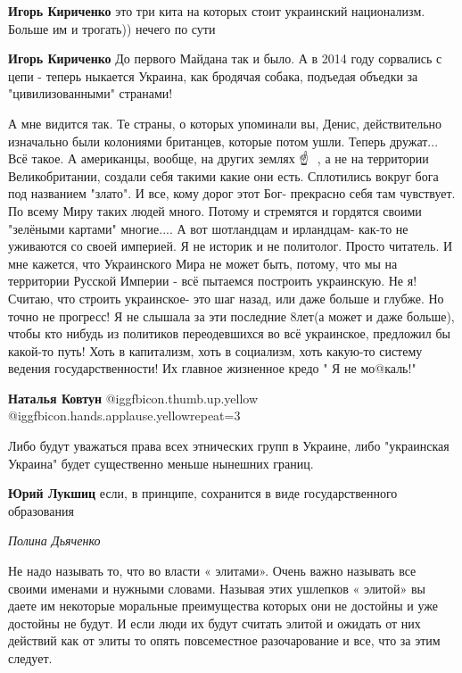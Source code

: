 \begin{itemize}
\begin{itemize}
\textbf{Игорь Кириченко} это три кита на которых стоит украинский национализм. Больше им и трогать)) нечего по сути

\textbf{Игорь Кириченко} До первого Майдана так и было. А в 2014 году сорвались с цепи - теперь ныкается Украина, как бродячая собака, подъедая объедки за "цивилизованными" странами!
\end{itemize} %


А мне видится так. Те страны, о которых упоминали вы, Денис, действительно
изначально были колониями британцев, которые потом ушли. Теперь дружат... Всё
такое. А американцы, вообще, на других землях ☝ ️ , а не на территории
Великобритании, создали себя такими какие они есть. Сплотились вокруг бога под
названием "злато". И все, кому дорог этот Бог- прекрасно себя там чувствует. По
всему Миру таких людей много. Потому и стремятся и гордятся своими "зелёными
картами" многие.... А вот шотландцам и ирландцам- как-то не уживаются со своей
империей. Я не историк и не политолог. Просто читатель. И мне кажется, что
Украинского Мира не может быть, потому, что мы на территории Русской Империи -
всё пытаемся построить украинскую. Не я! Считаю, что строить украинское- это
шаг назад, или даже больше и глубже. Но точно не прогресс! Я не слышала за эти
последние 8лет(а может и даже больше), чтобы кто нибудь из политиков
переодевшихся во всё украинское, предложил бы какой-то путь! Хоть в капитализм,
хоть в социализм, хоть какую-то систему ведения государственности! Их главное
жизненное кредо " Я не мо@каль!"

\begin{itemize} %
\textbf{Наталья Ковтун}  @igg{fbicon.thumb.up.yellow}  @igg{fbicon.hands.applause.yellow}{repeat=3} 
\end{itemize} %


Либо будут уважаться права всех этнических групп в Украине, либо "украинская
Украина" будет существенно меньше нынешних границ.

\begin{itemize} %
\textbf{Юрий Лукшиц} если, в принципе, сохранится в виде государственного образования
\end{itemize} %

\emph{Полина Дьяченко}

Не надо называть то, что во власти « элитами». Очень важно называть все своими
именами и нужными словами. Называя этих ушлепков « элитой» вы даете им
некоторые моральные преимущества которых они не достойны и уже достойны не
будут. И если люди их будут считать элитой и ожидать от них действий как от
элиты то опять повсеместное разочарование и все, что за этим следует.


\end{itemize}
